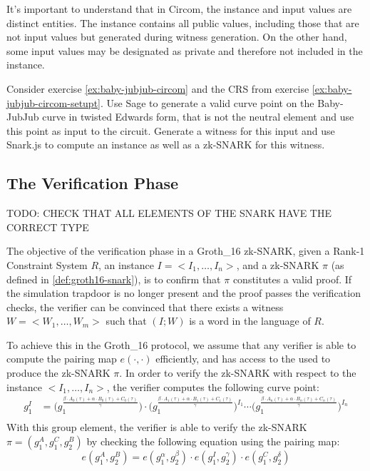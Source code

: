 \begin{example}
It's important to understand that in Circom, the instance and input values are distinct entities. The instance contains all public values, including those that are not input values but generated during witness generation. On the other hand, some input values may be designated as private and therefore not included in the instance. 
\end{example}

\begin{exercise} 
\label{ex:baby-jubjub-circom-prover}
Consider exercise \ref{ex:baby-jubjub-circom} and the CRS from exercise \ref{ex:baby-jubjub-circom-setupt}. Use Sage to generate a valid curve point on the Baby-JubJub curve in twisted Edwards form, that is not the neutral element and use this point as input to the circuit. Generate a witness for this input and use Snark.js to compute an instance as well as a zk-SNARK for this witness. 
\end{exercise}

\subsection{The Verification Phase}
\label{sec:groth16-verifier}

TODO: CHECK THAT ALL ELEMENTS OF THE SNARK HAVE THE CORRECT TYPE

The objective of the verification phase in a Groth\_16 zk-SNARK, given a Rank-1 Constraint System $R$, an instance $I = <I_1, \ldots, I_n>$, and a zk-SNARK $\pi$ (as defined in \ref{def:groth16-snark}), is to confirm that $\pi$ constitutes a valid proof. If the simulation trapdoor is no longer present and the proof passes the verification checks, the verifier can be convinced that there exists a witness $W = <W_1, \ldots, W_m>$ such that $(I;W)$ is a word in the language of $R$. 

To achieve this in the Groth\_16 protocol, we assume that any verifier is able to compute the pairing map $e(\cdot,\cdot)$ efficiently, and has access to the  used to produce the zk-SNARK $\pi$. In order to verify the zk-SNARK with respect to the instance $<I_1,\ldots, I_n>$, the verifier computes the following curve point:
\begin{align*}
g_1^I & = \Big(g_1^{\frac{\beta\cdot A_{0}(\tau)+\alpha\cdot B_{0}(\tau)+C_{0}(\tau)}{\gamma}}\Big)\cdot \Big(g_1^{\frac{\beta\cdot A_{1}(\tau)+\alpha\cdot B_{1}(\tau)+C_{1}(\tau)}{\gamma}}\Big)^{I_1} \cdots \Big(g_1^{\frac{\beta\cdot A_{n}(\tau)+\alpha\cdot B_{n}(\tau)+C_{n}(\tau)}{\gamma}}\Big)^{I_n}\\
\end{align*}
With this group element, the verifier is able to verify the zk-SNARK $\pi=(g_1^A,g_1^C,g_2^B)$ by checking the following equation using the pairing map:
\begin{equation}
\label{def:groth16-verifier-equation}
e(g_1^A, g_2^B) = e(g_1^\alpha,g_2^\beta)\cdot e(g_1^I,g_2^\gamma)\cdot e(g_1^C,g_2^\delta)
\end{equation}

